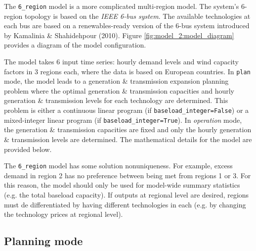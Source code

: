 \documentclass[preprint]{elsarticle}
\begin{document}
\noindent The \texttt{6\_region} model is a more complicated multi-region model. The system's 6-region topology is based on the \textit{IEEE 6-bus system}. The available technologies at each bus are based on a renewables-ready version of the 6-bus system introduced by Kamalinia \& Shahidehpour (2010). Figure \ref{fig:model_2:model_diagram} provides a diagram of the model configuration.

The model takes 6 input time series: hourly demand levels and wind capacity factors in 3 regions each, where the data is based on European countries. In \texttt{plan} mode, the model leads to a generation \& transmission expansion planning problem where the optimal generation \& transmission capacities and hourly generation \& transmission levels for each technology are determined. This problem is either a continuous linear program (if \texttt{baseload\_integer=False}) or a mixed-integer linear program (if \texttt{baseload\_integer=True}). In \textit{operation} mode, the generation \& transmission capacities are fixed and only the hourly generation \& transmission levels are determined. The mathematical details for the model are provided below.

The \texttt{6\_region} model has some solution nonuniqueness. For example, excess demand in region 2 has no preference between being met from regions 1 or 3. For this reason, the model should only be used for model-wide summary statistics (e.g. the total baseload capacity). If outputs at regional level are desired, regions must de differentiated by having different technologies in each (e.g. by changing the technology prices at regional level). 




\subsection{Planning mode}
\label{sec:appendix:optimisation:model_3}
\end{document}
